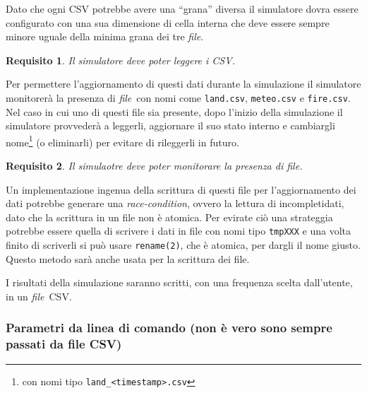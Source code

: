\documentclass[draft]{article}
\newcommand{\file}{\textit{file}}
\newtheorem{requirement}{Requisito}
\begin{document}
Dato che ogni CSV potrebbe avere una ``grana'' diversa il simulatore dovra
essere configurato con una sua dimensione di cella interna che deve essere
sempre minore uguale della minima grana dei tre \file.

\begin{requirement}
Il simulatore deve poter leggere i CSV.
\end{requirement}

Per permettere l'aggiornamento di questi dati durante la simulazione il
simulatore monitorerà la presenza di \file\ con nomi come \texttt{land.csv},
\texttt{meteo.csv} e \texttt{fire.csv}. Nel caso in cui uno di questi file sia
presente, dopo l'inizio della simulazione il simulatore provvederà a leggerli,
aggiornare il suo stato interno e cambiargli nome\footnote{con nomi tipo
\texttt{land\_<timestamp>.csv}} (o eliminarli) per evitare di rileggerli in
futuro.

\begin{requirement}
Il simulaotre deve poter monitorare la presenza di file.
\end{requirement}

Un implementazione ingenua della scrittura di questi file per l'aggiornamento
dei dati potrebbe generare una \textit{race-condition}, ovvero la lettura di
incompletidati, dato che la scrittura in un file non è atomica. Per evirate ciò
una strateggia potrebbe essere quella di scrivere i dati in file con nomi tipo
\texttt{tmpXXX} e una volta finito di scriverli si può usare \texttt{rename(2)},
che è atomica, per dargli il nome giusto. Questo metodo sarà anche usata per la
scrittura dei file.

I risultati della simulazione saranno scritti, con una frequenza scelta
dall'utente, in un \file\ CSV.

\subsubsection{Parametri da linea di comando (non è vero sono sempre passati da
file CSV)}
\end{document}
